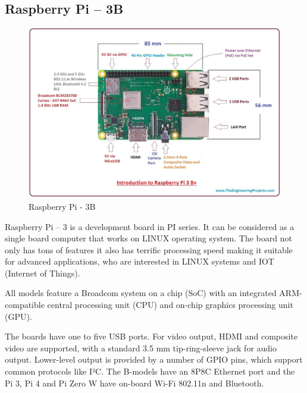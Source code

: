 \subsection{Raspberry Pi – 3B}

\begin{figure}[h]\centering
\includegraphics[width=5.5in]{./images/RaspberryPi.jpg}
\caption{Raspberry Pi - 3B}\label{RaspberryPi}
\end{figure}

Raspberry Pi – 3 is a development board in PI series. It can be considered as a single board computer that works on LINUX operating system. The board not only has tons of features it also has terrific processing speed making it suitable for advanced applications, who are interested in LINUX systems and IOT (Internet of Things).

All models feature a Broadcom system on a chip (SoC) with an integrated ARM-compatible central processing unit (CPU) and on-chip graphics processing unit (GPU).

The boards have one to five USB ports. For video output, HDMI and composite video are supported, with a standard 3.5 mm tip-ring-sleeve jack for audio output. Lower-level output is provided by a number of GPIO pins, which support common protocols like I²C. The B-models have an 8P8C Ethernet port and the Pi 3, Pi 4 and Pi Zero W have on-board Wi-Fi 802.11n and Bluetooth.

\pagebreak